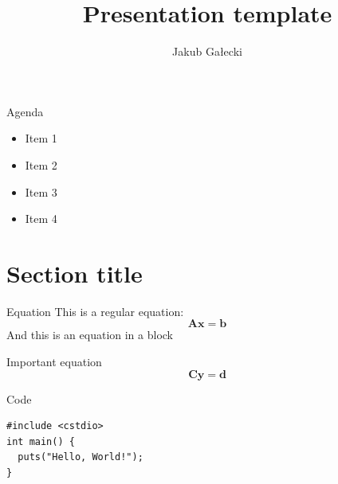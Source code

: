 \documentclass{beamer}
\author{Jakub Gałecki}
\title{Presentation template}
\institute{Division of Aerodynamics}
\date{\vspace{5pt}\formatdate{22}{2}{2022}}
\begin{document}
\maketitle


\begin{frame}{Agenda}
\begin{itemize}
\item Item 1
\item Item 2
\item Item 3
\item Item 4
\end{itemize}
\end{frame}

\section{Section title}
\begin{frame}{Equation}
This is a regular equation:
\begin{equation}
\mathbf{A}\mathbf{x} = \textbf{b}
\end{equation}
And this is an equation in a block
\begin{block}{Important equation}
\begin{equation}
\mathbf{C}\mathbf{y} = \textbf{d}
\end{equation}
\end{block}
\end{frame}

\begin{frame}[fragile]{Code}
\begin{verbatim}
#include <cstdio>
int main() {
  puts("Hello, World!");
}
\end{verbatim}
\end{frame}
\end{document}
